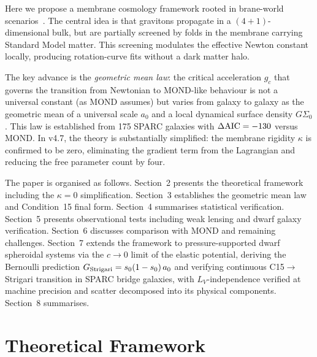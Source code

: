 \documentclass[11pt,a4paper]{article}
\newcommand{\gc}{g_{c}}
\newcommand{\ao}{a_{0}}
\newcommand{\so}{s_{0}}
\newcommand{\LV}{L_{V}}
\newcommand{\kap}{\kappa}
\newcommand{\Gstr}{G_{\rm Strigari}}
\newcommand{\AIC}{\Delta{\rm AIC}}
\begin{document}
Here we propose a membrane cosmology framework rooted in brane-world scenarios~\citep{RandallSundrum1999}.
The central idea is that gravitons propagate in a $(4+1)$-dimensional bulk, but are partially screened by
folds in the membrane carrying Standard Model matter. This screening modulates the effective Newton constant
locally, producing rotation-curve fits without a dark matter halo.

The key advance is the \emph{geometric mean law}: the critical acceleration $\gc$ that governs the transition
from Newtonian to MOND-like behaviour is not a universal constant (as MOND assumes) but varies from galaxy
to galaxy as the geometric mean of a universal scale $\ao$ and a local dynamical surface density $G\Sigma_0$.
This law is established from 175 SPARC galaxies with $\AIC = -130$ versus MOND. In v4.7, the theory is
substantially simplified: the membrane rigidity $\kap$ is confirmed to be zero, eliminating the gradient
term from the Lagrangian and reducing the free parameter count by four.

The paper is organised as follows. Section~2 presents the theoretical framework including the $\kap=0$
simplification. Section~3 establishes the geometric mean law and Condition~15 final form. Section~4
summarises statistical verification. Section~5 presents observational tests including weak lensing and dwarf
galaxy verification. Section~6 discusses comparison with MOND and remaining challenges. Section~7 extends
the framework to pressure-supported dwarf spheroidal systems via the $c \to 0$ limit of the elastic potential,
deriving the Bernoulli prediction $\Gstr = \so(1-\so)\,\ao$ and verifying continuous C15$\to$Strigari
transition in SPARC bridge galaxies, with $\LV$-independence verified at machine precision and scatter
decomposed into its physical components. Section~8 summarises.

\section{Theoretical Framework}
\end{document}
